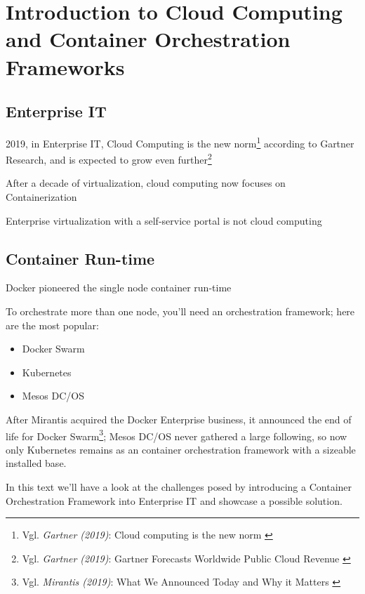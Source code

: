 %
%

\pagebreak
\section{Introduction to Cloud Computing and Container Orchestration Frameworks}

\onehalfspacing

\subsection{Enterprise IT}

2019, in Enterprise IT, Cloud Computing is the new norm\footnote{Vgl. \textit{Gartner (2019)}: Cloud computing is the new norm \cite{gartnerCloudStatement}} according to Gartner Research, and is expected to grow even further\footnote{Vgl. \textit{Gartner (2019)}: Gartner Forecasts Worldwide Public Cloud Revenue \cite{gartnerForecast}}

After a decade of virtualization, cloud computing now focuses on Containerization

Enterprise virtualization with a self-service portal is not cloud computing

\subsection{Container Run-time}

Docker pioneered the single node container run-time

To orchestrate more than one node, you'll need an orchestration framework; here are the most popular:
\begin{itemize}
\item Docker Swarm
\item Kubernetes
\item Mesos DC/OS
\end{itemize}

After Mirantis acquired the Docker Enterprise business, it announced the end of life for Docker Swarm\footnote{Vgl. \textit{Mirantis (2019)}: What We Announced Today and Why it Matters \cite{mirantisDocker}}; Mesos DC/OS never gathered a large following, so now only Kubernetes remains as an container orchestration framework with a sizeable installed base.

In this text we'll have a look at the challenges posed by introducing a Container Orchestration Framework into Enterprise IT and showcase a possible solution.
